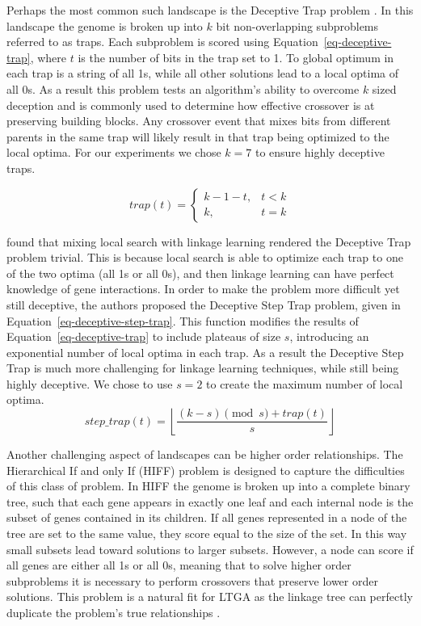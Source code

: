 \documentclass[twoside]{article}
\begin{document}
Perhaps the most common such landscape is the Deceptive Trap problem \citep{goldberg:1991:gasize}.
In this landscape the genome is broken up into $k$ bit non-overlapping subproblems referred
to as traps.
Each subproblem is scored using Equation~\ref{eq-deceptive-trap}, where $t$ is the number of
bits in the trap set to 1. To global optimum in each trap is a string of all 1s, while all
other solutions lead to a local optima of all 0s. As a result this problem tests an algorithm's
ability to overcome $k$ sized deception and is commonly used to determine how effective crossover
is at preserving building blocks. Any crossover event that mixes bits from different parents in
the same trap will likely result in that trap being optimized to the local optima. For our experiments
we chose $k=7$ to ensure highly deceptive traps.

\begin{equation}
   trap(t) = \left\{
     \begin{array}{rl}
       k-1-t, &  t<k\\
       k,   &  t = k
     \end{array}
   \right.
  \label{eq-deceptive-trap}
\end{equation}

\cite{goldman:2012:ltga} found that mixing local search with linkage learning rendered the Deceptive
Trap problem trivial. This is because local search is able to optimize each trap to one of the two
optima (all 1s or all 0s), and then linkage learning can have perfect knowledge of gene interactions.
In order to make the problem more difficult yet still deceptive, the authors proposed the Deceptive
Step Trap problem, given in Equation~\ref{eq-deceptive-step-trap}. This function modifies the results
of Equation~\ref{eq-deceptive-trap} to include plateaus of size $s$, introducing an exponential number
of local optima in each trap. As a result the Deceptive Step Trap is much more challenging for linkage
learning techniques, while still being highly deceptive. We chose to use $s=2$ to create the maximum
number of local optima.
\begin{equation}
   step\_trap(t) = \left \lfloor \frac{(k-s)\pmod{s} + trap(t)}{s} \right \rfloor
  \label{eq-deceptive-step-trap}
\end{equation}

Another challenging aspect of landscapes can be higher order relationships. The Hierarchical If
and only If (HIFF) problem is designed to capture the difficulties of this class of problem.
In HIFF the genome is broken up into a complete binary tree, such that each gene appears in exactly one
leaf and each internal node is the subset of genes contained in its children. If all genes represented
in a node of the tree are set to the same value, they score equal to the size of the set. In this way
small subsets lead toward solutions to larger subsets. However, a node can score if all genes are either
all 1s or all 0s, meaning that to solve higher order subproblems it is necessary to perform crossovers
that preserve lower order solutions. This problem is a natural fit for LTGA as the linkage tree can
perfectly duplicate the problem's true relationships \citep{thierens:2013:ltgahiff}.
\end{document}
